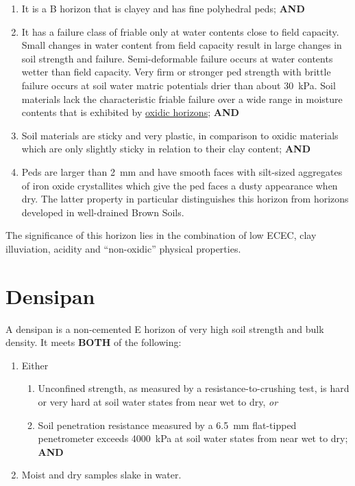 \documentclass[
  letterpaper,
  DIV=11,
  numbers=noendperiod]{scrreprt}
\providecommand{\tightlist}{%
  \setlength{\itemsep}{0pt}\setlength{\parskip}{0pt}}\usepackage{longtable,booktabs,array}
\begin{document}
\begin{enumerate}
\def\labelenumi{\arabic{enumi}.}
\tightlist
\item
  It is a B horizon that is clayey and has fine polyhedral peds;
  \textbf{AND}
\item
  It has a failure class of friable only at water contents close to
  field capacity. Small changes in water content from field capacity
  result in large changes in soil strength and failure. Semi-deformable
  failure occurs at water contents wetter than field capacity. Very firm
  or stronger ped strength with brittle failure occurs at soil water
  matric potentials drier than about 30~kPa. Soil materials lack the
  characteristic friable failure over a wide range in moisture contents
  that is exhibited by \protect\hyperlink{sec-diag-oxh}{oxidic
  horizons}; \textbf{AND}
\item
  Soil materials are sticky and very plastic, in comparison to oxidic
  materials which are only slightly sticky in relation to their clay
  content; \textbf{AND}
\item
  Peds are larger than 2~mm and have smooth faces with silt-sized
  aggregates of iron oxide crystallites which give the ped faces a dusty
  appearance when dry. The latter property in particular distinguishes
  this horizon from horizons developed in well-drained Brown Soils.
\end{enumerate}

The significance of this horizon lies in the combination of low ECEC,
clay illuviation, acidity and ``non-oxidic'' physical properties.

\hypertarget{sec-diag-dens}{%
\section{Densipan}\label{sec-diag-dens}}

A densipan is a non-cemented E horizon of very high soil strength and
bulk density. It meets \textbf{BOTH} of the following:

\begin{enumerate}
\def\labelenumi{\arabic{enumi}.}
\tightlist
\item
  Either

  \begin{enumerate}
  \def\labelenumii{(\alph{enumii})}
  \tightlist
  \item
    Unconfined strength, as measured by a resistance-to-crushing test,
    is hard or very hard at soil water states from near wet to dry,
    \emph{or}
  \item
    Soil penetration resistance measured by a 6.5~mm flat-tipped
    penetrometer exceeds 4000~kPa at soil water states from near wet to
    dry; \textbf{AND}
  \end{enumerate}
\item
  Moist and dry samples slake in water.
\end{enumerate}
\end{document}
